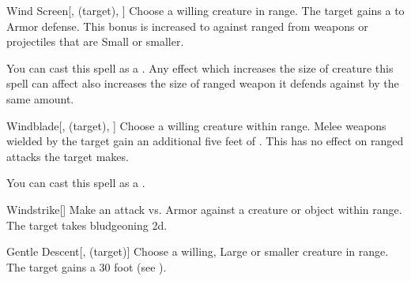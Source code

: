 \lowercase{\hypertarget{spell:Wind Screen}{}}\label{spell:Wind Screen}
\begin{attuneability}[\nth{1}]{\hypertarget{spell:Wind Screen}{Wind Screen}}[,  (target), ]
Choose a willing creature in \rngclose range.
The target gains a   to Armor defense.
This bonus is increased to  against ranged  from weapons or projectiles that are Small or smaller.

You can cast this spell as a .
Any effect which increases the size of creature this spell can affect also increases the size of ranged weapon it defends against by the same amount.
\end{attuneability}
\vspace{0.25em}



\lowercase{\hypertarget{spell:Windblade}{}}\label{spell:Windblade}
\begin{attuneability}[\nth{1}]{\hypertarget{spell:Windblade}{Windblade}}[,  (target), ]
Choose a willing creature within \rngclose range.
Melee weapons wielded by the target gain an additional five feet of .
This has no effect on ranged attacks the target makes.

You can cast this spell as a .
\end{attuneability}
\vspace{0.25em}



\lowercase{\hypertarget{spell:Windstrike}{}}\label{spell:Windstrike}
\begin{apability}[\nth{1}]{\hypertarget{spell:Windstrike}{Windstrike}}[]
Make an attack vs. Armor against a creature or object within \rngmed range.
\hit The target takes bludgeoning  \plus2d.
\end{apability}
\vspace{0.25em}



\lowercase{\hypertarget{spell:Gentle Descent}{}}\label{spell:Gentle Descent}
\begin{attuneability}[\nth{2}]{\hypertarget{spell:Gentle Descent}{Gentle Descent}}[,  (target)]
Choose a willing, Large or smaller creature in \rngclose range.
The target gains a 30 foot  (see ).
\end{attuneability}
\vspace{0.25em}



